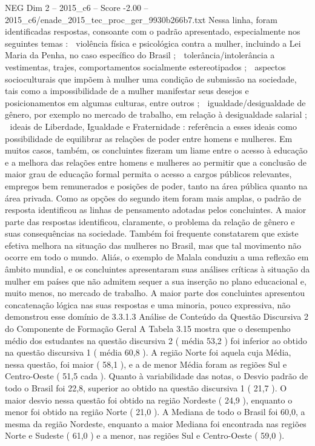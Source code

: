\begin{textsample}{NEG Dim 2 – 2015\_c6 – Score -2.00 – 2015\_c6/enade\_2015\_tec\_proc\_ger\_9930b266b7.txt}
Nessa linha, foram identificadas respostas, consoante com o padrão apresentado, especialmente nos seguintes temas :  violência física e psicológica contra a mulher, incluindo a Lei Maria da Penha, no caso específico do Brasil ;  tolerância/intolerância a vestimentas, trajes, comportamentos socialmente estereotipados ;  aspectos socioculturais que impõem à mulher uma condição de submissão na sociedade, tais como a impossibilidade de a mulher manifestar seus desejos e posicionamentos em algumas culturas, entre outros ;  igualdade/desigualdade de gênero, por exemplo no mercado de trabalho, em relação à desigualdade salarial ;  ideais de Liberdade, Igualdade e Fraternidade : referência a esses ideais como possibilidade de equilibrar as relações de poder entre homens e mulheres.
Em muitos casos, também, os concluintes fizeram um liame entre o acesso à educação e a melhora das relações entre homens e mulheres ao permitir que a conclusão de maior grau de educação formal permita o acesso a cargos públicos relevantes, empregos bem remunerados e posições de poder, tanto na área pública quanto na área privada.
Como as opções do segundo item foram mais amplas, o padrão de resposta identificou as linhas de pensamento adotadas pelos concluintes.
A maior parte das respostas identificou, claramente, o problema da relação de gênero e suas consequências na sociedade.
Também foi frequente constatarem que existe efetiva melhora na situação das mulheres no Brasil, mas que tal movimento não ocorre em todo o mundo.
Aliás, o exemplo de Malala conduziu a uma reflexão em âmbito mundial, e os concluintes apresentaram suas análises críticas à situação da mulher em países que não admitem sequer a sua inserção no plano educacional e, muito menos, no mercado de trabalho.
A maior parte dos concluintes apresentou concatenação lógica nas suas respostas e uma minoria, pouco expressiva, não demonstrou esse domínio de 3.3.1.3 Análise de Conteúdo da Questão Discursiva 2 do Componente de Formação Geral A Tabela 3.15 mostra que o desempenho médio dos estudantes na questão discursiva 2 ( média 53,2 ) foi inferior ao obtido na questão discursiva 1 ( média 60,8 ).
A região Norte foi aquela cuja Média, nessa questão, foi maior ( 58,1 ), e a de menor Média foram as regiões Sul e Centro-Oeste ( 51,5 cada ).
Quanto à variabilidade das notas, o Desvio padrão de todo o Brasil foi 22,8, superior ao obtido na questão discursiva 1 ( 21,7 ).
O maior desvio nessa questão foi obtido na região Nordeste ( 24,9 ), enquanto o menor foi obtido na região Norte ( 21,0 ).
A Mediana de todo o Brasil foi 60,0, a mesma da região Nordeste, enquanto a maior Mediana foi encontrada nas regiões Norte e Sudeste ( 61,0 ) e a menor, nas regiões Sul e Centro-Oeste ( 59,0 ).

\end{textsample}
